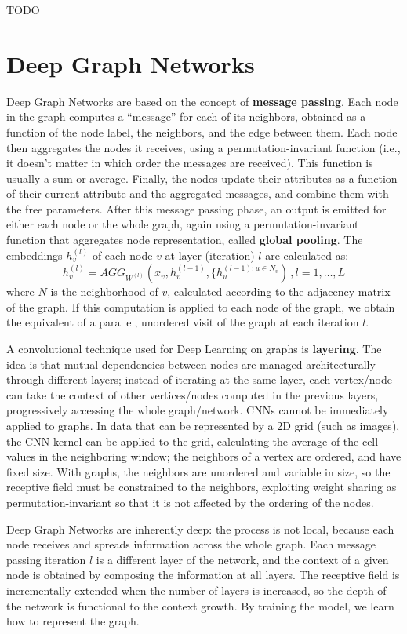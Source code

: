 TODO

\section{Deep Graph Networks}

Deep Graph Networks are based on the concept of \textbf{message passing}. Each node in the graph computes a ``message'' for each of its neighbors, obtained as a function of the node label, the neighbors, and the edge between them. Each node then aggregates the nodes it receives, using a permutation-invariant function (i.e., it doesn't matter in which order the messages are received). This function is usually a sum or average. Finally, the nodes update their attributes as a function of their current attribute and the aggregated messages, and combine them with the free parameters. After this message passing phase, an output is emitted for either each node or the whole graph, again using a permutation-invariant function that aggregates node representation, called \textbf{global pooling}. The embeddings $h_v^{(l)}$ of each node $v$ at layer (iteration) $l$ are calculated as:
\begin{equation*}
    h_v^{(l)} = AGG_{W^{(l)}}(x_v, h_v^{(l-1)}, \{h_u^{(l-1) : u \in N_v}) \,, l = 1, \dots , L
\end{equation*}
where $N$ is the neighborhood of $v$, calculated according to the adjacency matrix of the graph. If this computation is applied to each node of the graph, we obtain the equivalent of a parallel, unordered visit of the graph at each iteration $l$.

A convolutional technique used for Deep Learning on graphs is \textbf{layering}. The idea is that mutual dependencies between nodes are managed architecturally through different layers; instead of iterating at the same layer, each vertex/node can take the context of other vertices/nodes computed in the previous layers, progressively accessing the whole graph/network. CNNs cannot be immediately applied to graphs. In data that can be represented by a 2D grid (such as images), the CNN kernel can be applied to the grid, calculating the average of the cell values in the neighboring window; the neighbors of a vertex are ordered, and have fixed size. With graphs, the neighbors are unordered and variable in size, so the receptive field must be constrained to the neighbors, exploiting weight sharing as permutation-invariant so that it is not affected by the ordering of the nodes.

Deep Graph Networks are inherently deep: the process is not local, because each node receives and spreads information across the whole graph. Each message passing iteration $l$ is a different layer of the network, and the context of a given node is obtained by composing the information at all layers. The receptive field is incrementally extended when the number of layers is increased, so the depth of the network is functional to the context growth. By training the model, we learn how to represent the graph.

